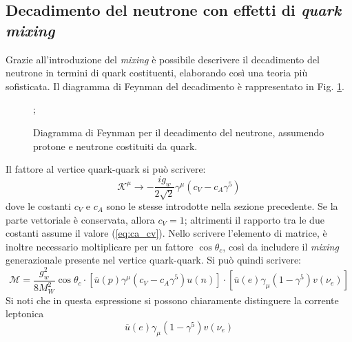 \documentclass{subnucbo}
\begin{document}
\subsection{Decadimento del neutrone con effetti di \textit{quark mixing}}
Grazie all'introduzione del \textit{mixing} è possibile descrivere il decadimento del neutrone in termini di quark costituenti, elaborando così una teoria più sofisticata. Il diagramma di Feynman del decadimento è rappresentato in Fig. \ref{fig:neutron_decay_quarks}.
\begin{figure}[!h]
        \centering
        ;
        \caption{Diagramma di Feynman per il decadimento del neutrone, assumendo protone e neutrone costituiti da quark.}
        \label{fig:neutron_decay_quarks}
\end{figure}
Il fattore al vertice quark-quark si può scrivere:
\begin{equation}
        \mathcal { K } ^ { \mu } \rightarrow - \frac { i g _ { w } } { 2 \sqrt { 2 } } \gamma ^ { \mu } \left( c _ { V } - c _ { A } \gamma ^ { 5 } \right)
\end{equation}
dove le costanti $c_{V}$ e $c_{A}$ sono le stesse introdotte nella sezione precedente. Se la parte vettoriale è conservata, allora $c_{V} = 1$; altrimenti il rapporto tra le due costanti assume il valore (\ref{eq:ca_cv}). Nello scrivere l'elemento di matrice, è inoltre necessario moltiplicare per un fattore $\cos\theta_{c}$, così da includere il \textit{mixing} generazionale presente nel vertice quark-quark. Si può quindi scrivere:
\begin{equation}
        \mathcal { M } = \frac { g _ { w } ^ { 2 } } { 8 M _ { W } ^ { 2 } } \cos\theta_{c} \cdot \left[ \overline { u } ( p ) \gamma ^ { \mu } \left( c _ { V } - c _ { A } \gamma ^ { 5 } \right) u ( n ) \right] \cdot \left[ \overline { u } ( e ) \gamma _ { \mu } \left( 1 - \gamma ^ { 5 } \right) v \left( \nu _ { e } \right) \right]
        \label{eq:neutron_complex_matrix_element}
\end{equation}
Si noti che in questa espressione si possono chiaramente distinguere la corrente leptonica
\begin{equation}
        \overline { u } ( e ) \gamma _ { \mu } \left( 1 - \gamma ^ { 5 } \right) v \left( \nu _ { e } \right)
        \label{eq:leptonic_current}
\end{equation}
\end{document}
